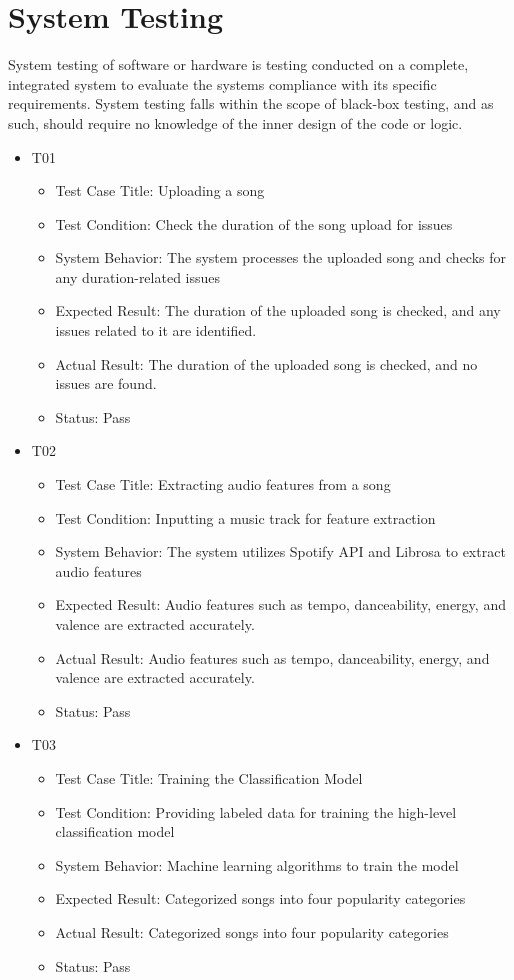 \documentclass[11pt]{report}
\begin{document}
 \section{System Testing}
 System testing of software or hardware is testing conducted on a complete, integrated system to evaluate the systems compliance with its specific requirements. System testing falls within the scope of black-box testing, and as such, should require no knowledge of the inner design of the code or logic.
\begin{itemize}

\item T01
    \begin{itemize}
        \item Test Case Title: Uploading a song
        \item Test Condition: Check the duration of the song upload for issues
       \item System Behavior: The system processes the uploaded song and checks for any duration-related issues
        \item Expected Result: The duration of the uploaded song is checked, and any issues related to it are identified.
        \item Actual Result: The duration of the uploaded song is checked, and no issues are found.
        \item Status: Pass
    \end{itemize}
    \item T02
    \begin{itemize}
        \item Test Case Title: Extracting audio features from a song
        \item Test Condition: Inputting a music track for feature extraction
        \item System Behavior: The system utilizes Spotify API and Librosa to extract audio features
        \item Expected Result: Audio features such as tempo, danceability, energy, and valence are extracted accurately.
        \item Actual Result: Audio features such as tempo, danceability, energy, and valence are extracted accurately.
        \item Status: Pass
    \end{itemize}
    
    \item T03
    \begin{itemize}
        \item Test Case Title: Training the Classification Model
        \item Test Condition: Providing labeled data for training the high-level classification model
        \item System Behavior: Machine learning algorithms to train the model
        \item Expected Result: Categorized songs into four popularity categories
        \item Actual Result: Categorized songs into four popularity categories
        \item Status: Pass
    \end{itemize}


\end{itemize}
\end{document}
